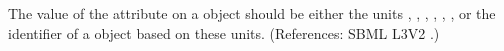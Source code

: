 The value of the attribute  on a \Model object should be
either the units , , ,
, , , or the identifier of a
\UnitDefinition object based on these units.  (References: SBML L3V2
.)
